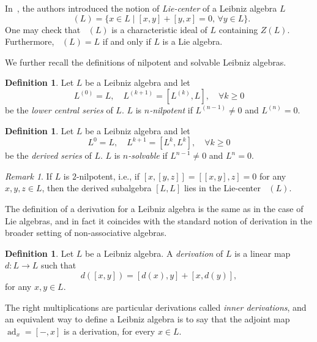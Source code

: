 \documentclass[11pt,a4paper]{amsart}
\theoremstyle{plain}
\theoremstyle{definition}
\newtheorem{definition}[subsection]{Definition}
\theoremstyle{remark}
\newtheorem{remark}[subsection]{Remark}
\numberwithin{equation}{section}
\newcommand{\0}{\emptyset}
\DeclareMathOperator{\ad}{ad}
\DeclareMathOperator{\ZL}{Z_{Lie}}
\begin{document}
In~\cite{casas_center}, the authors introduced the notion of \emph{Lie-center} of a Leibniz algebra $L$
\[
\ZL(L)=\lbrace x \in L \mid [x,y]+[y,x]=0, \, \forall y \in L \rbrace.
\]
One may check that $\ZL(L)$ is a characteristic ideal of $L$ containing $Z(L)$. Furthermore, $\ZL(L)=L$ if and only if $L$ is a Lie algebra.

We further recall the definitions of nilpotent and solvable Leibniz algebras.

\begin{definition}
Let $L$ be a Leibniz algebra and let
\[
L^{(0)}=L, \quad L^{(k+1)}=[L^{(k)},L], \quad \forall k \geq 0
\]
be the \emph{lower central series} of $L$. $L$ is \emph{$n$-nilpotent} if $L^{(n-1)} \neq 0$ and $L^{(n)}=0$.
\end{definition}


\begin{definition}
Let $L$ be a Leibniz algebra and let
\[
L^{0}=L, \quad L^{k+1}=[L^{k},L^k], \quad \forall k \geq 0
\]
be the \emph{derived series} of $L$. $L$ is \emph{$n$-solvable} if $L^{n-1} \ne 0$ and $L^{n}=0$.
\end{definition}

\begin{remark}
If $L$ is $2$-nilpotent, i.e., if $[x,[y,z]]=[[x,y],z]=0$ for any $x,y,z \in L$, then the derived subalgebra $[L,L]$ lies in the Lie-center $\ZL(L)$. 
\end{remark}

The definition of a derivation for a Leibniz algebra is the same as in the case
of Lie algebras, and in fact it coincides with the standard notion of derivation
in the broader setting of non-associative algebras.

\begin{definition}
Let $L$ be a Leibniz algebra. A \emph{derivation} of $L$ is a linear map $d \colon L \to L$ such that 
\[
d(\left[x,y\right])=\left[d(x),y\right]+\left[x,d(y)\right],
\]
for any $x,y \in L$.
\end{definition}

The right multiplications are particular derivations called \emph{inner derivations}, and an equivalent way to define a Leibniz algebra is to say that the adjoint map $\ad_x=\left[-,x\right]$ is a derivation, for every $x \in L$.
\end{document}
